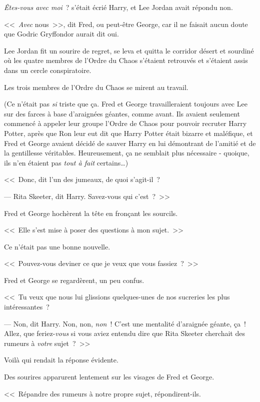 \emph{Êtes-vous avec moi}~? s'était écrié Harry, et Lee Jordan avait répondu non.

<<~\emph{Avec} nous~>>, dit Fred, ou peut-être George, car il ne faisait aucun doute que Godric Gryffondor aurait dit oui.

Lee Jordan fit un sourire de regret, se leva et quitta le corridor désert et sourdiné où les quatre membres de l'Ordre du Chaos s'étaient retrouvés et s'étaient assis dans un cercle conspiratoire.

Les trois membres de l'Ordre du Chaos se mirent au travail.

(Ce n'était pas \emph{si} triste que ça. Fred et George travailleraient toujours avec Lee sur des farces à base d'araignées géantes, comme avant. Ils avaient seulement commencé à appeler leur groupe l'Ordre de Chaos pour pouvoir recruter Harry Potter, après que Ron leur eut dit que Harry Potter était bizarre et maléfique, et Fred et George avaient décidé de sauver Harry en lui démontrant de l'amitié et de la gentillesse véritables. Heureusement, ça ne semblait plus nécessaire - quoique, ils n'en étaient pas \emph{tout à fait} certains…)

<<~Donc, dit l'un des jumeaux, de quoi s'agit-il~?

--- Rita Skeeter, dit Harry. Savez-vous qui c'est~?~>>

Fred et George hochèrent la tête en fronçant les sourcils.

<<~Elle s'est mise à poser des questions à mon sujet.~>>

Ce n'était pas une bonne nouvelle.

<<~Pouvez-vous deviner ce que je veux que vous fassiez~?~>>

Fred et George se regardèrent, un peu confus.

<<~Tu veux que nous lui glissions quelques-unes de nos sucreries les plus intéressantes~?

--- Non, dit Harry. Non, non, \emph{non}~! C'est une mentalité d'araignée géante, ça~! Allez, que feriez-\emph{vous} si vous aviez entendu dire que Rita Skeeter cherchait des rumeurs à \emph{votre} sujet~?~>>

Voilà qui rendait la réponse évidente.

Des sourires apparurent lentement sur les visages de Fred et George.

<<~Répandre des rumeurs à notre propre sujet, répondirent-ils.

